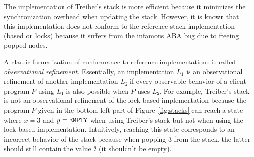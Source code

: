 The implementation of Treiber's stack is more efficient because it minimizes the synchronization overhead when updating the stack. However, it is known that this implementation does not conform to the reference stack implementation (based on locks) because it suffers from the infamous ABA bug due to freeing popped nodes.

A classic formalization of conformance to reference implementations is called \emph{observational refinement}. Essentially, an implementation $L_1$ is an observational refinement of another implementation $L_2$ if every observable behavior of a client program $P$ using $L_1$ is also possible when $P$ uses $L_2$. For example, Treiber's stack is not an observational refinement of the lock-based implementation because the program $P$ given in the bottom-left part of Figure~\ref{fig:stacks} can reach a state where $x=3$ and $y={\tt EMPTY}$ when using Treiber's stack but not when using the lock-based implementation. Intuitively, reaching this state corresponds to an incorrect behavior of the stack because when popping $3$ from the stack, the latter should still contain the value $2$ (it shouldn't be empty).












